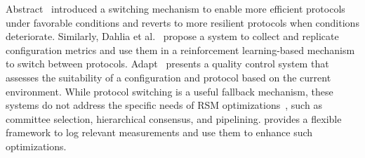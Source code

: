 Abstract~\cite{Abstract} introduced a switching mechanism to enable more efficient protocols under favorable conditions and reverts to more resilient protocols when conditions deteriorate.
Similarly, Dahlia et al.~\cite{Dahlia} propose a system to collect and replicate configuration metrics and use them in a reinforcement learning-based mechanism to switch between protocols.
Adapt~\cite{adapt} presents a quality control system that assesses the suitability of a configuration and protocol based on the current environment.
While protocol switching is a useful fallback mechanism, these systems do not address the specific needs of RSM optimizations~\cite{berger2023sok}, such as committee selection, hierarchical consensus, and pipelining.
\sysname provides a flexible framework to log relevant measurements and use them to enhance such optimizations.
